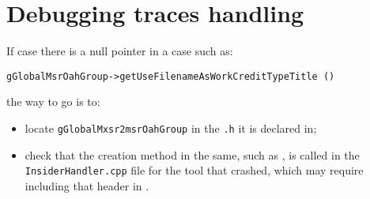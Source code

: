 \section{Debugging traces handling}

If case there is a null pointer in a case such as:
\begin{lstlisting}[language=CPlusPlus]
    gGlobalMsrOahGroup->getUseFilenameAsWorkCreditTypeTitle ()
\end{lstlisting}

the way to go is to:%
\begin{itemize}
\item locate {\tt gGlobalMxsr2msrOahGroup} in the {\tt *.h} it is declared in;
\item check that the creation method in the same, such as , is called in the {\tt *InsiderHandler.cpp} file for the tool that crashed, which may require including that  header in .
\end{itemize}


